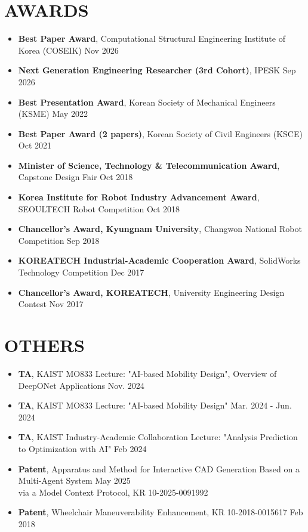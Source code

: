 \documentclass[a4paper,10pt]{article}
\begin{document}
\section*{AWARDS}
\begin{itemize}[left=0pt]
    \item \textbf{Best Paper Award}, Computational Structural Engineering Institute of Korea (COSEIK) \hfill Nov 2026
    \item \textbf{Next Generation Engineering Researcher (3rd Cohort)}, IPESK \hfill Sep 2026
    \item \textbf{Best Presentation Award}, Korean Society of Mechanical Engineers (KSME) \hfill May 2022
    \item \textbf{Best Paper Award (2 papers)}, Korean Society of Civil Engineers (KSCE) \hfill Oct 2021
    \item \textbf{Minister of Science, Technology \& Telecommunication Award}, Capstone Design Fair \hfill Oct 2018
    \item \textbf{Korea Institute for Robot Industry Advancement Award}, SEOULTECH Robot Competition \hfill Oct 2018
    \item \textbf{Chancellor’s Award, Kyungnam University}, Changwon National Robot Competition \hfill Sep 2018
    \item \textbf{KOREATECH Industrial-Academic Cooperation Award}, SolidWorks Technology Competition \hfill Dec 2017
    \item \textbf{Chancellor’s Award, KOREATECH}, University Engineering Design Contest \hfill Nov 2017
\end{itemize}


\section*{OTHERS}
\begin{itemize}[left=0pt]
    \item \textbf{TA}, KAIST MO833 Lecture: "AI-based Mobility Design", Overview of DeepONet Applications \hfill Nov. 2024
    \item \textbf{TA}, KAIST MO833 Lecture: "AI-based Mobility Design" \hfill Mar. 2024 - Jun. 2024
    \item \textbf{TA}, KAIST Industry-Academic Collaboration Lecture: "Analysis Prediction to Optimization with AI" \hfill Feb 2024
    \item \textbf{Patent}, Apparatus and Method for Interactive CAD Generation Based on a Multi-Agent System \hfill May 2025 \\
    via a Model Context Protocol, KR 10-2025-0091992
    \item \textbf{Patent}, Wheelchair Maneuverability Enhancement, KR 10-2018-0015617 \hfill Feb 2018
\end{itemize}
\end{document}
